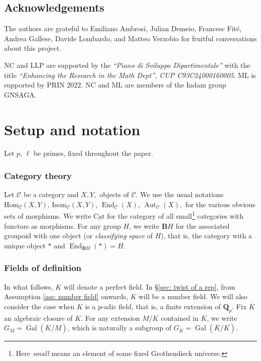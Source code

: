 \documentclass[a4paper,10pt]{amsart}
\theoremstyle{plain}
\theoremstyle{definition}
\theoremstyle{remark}
\def\Q{\mathbf Q}
\def\ul#1{\underline{#1}}
\def\mr#1{\mathrm{#1}}
\def\Ccal{\mathcal{C}}
\def\Bbf{\mathbf{B}}
\renewcommand{\hom}{\mr{Hom}}
\DeclareMathOperator{\Aut}{Aut}
\DeclareMathOperator{\Gal}{Gal}
\DeclareMathOperator{\End}{End}
\begin{document}
\subsection*{Acknowledgements}
The authors are grateful to Emiliano Ambrosi, Julian Demeio, Francesc Fit\'e, Andrea Gallese, Davide Lombardo, and Matteo Verzobio for fruitful conversations about this project.
\par NC and LLP are supported by the \emph{``Piano di Sviluppo Dipartimentale''} with the title \emph{``Enhancing the Research in the Math Dept'', CUP C93C24000160005}. ML is supported by PRIN 2022. NC and ML are members of the Indam group GNSAGA.

\section{Setup and notation}\label{sec: setup}

Let \(p,\, \ell\) be primes, fixed throughout the paper.

\subsubsection*{Category theory}
Let \(\Ccal\) be a category and \(X, Y,\) objects of \(\Ccal\). We use the usual notations \(\hom_{\Ccal}(X, Y)\), \(\mr{Isom}_{\Ccal}(X, Y)\), \(\End_{\Ccal}(X)\), \(\Aut_{\Ccal}(X),\) for the various obvious sets of morphisms. We write \(\ul{\mr{Cat}}\) for the category of all small\footnote{Here \emph{small} means an element of some fixed Grothendieck universe.} categories with functors as morphisms. For any group \(H\), we write \(\Bbf H\) for the associated groupoid  with one object (or \emph{classifying space} of \(H\)), that is, the category with a unique object \(\ast\) and \(\End_{\Bbf H}(\ast) = H\). 

\subsubsection*{Fields of definition}
In what follows, \(K\) will denote a perfect field. In \S\ref{sec: twist of a rep}, from Assumption \ref{ass: number field} onwards, \(K\) will be a number field. We will also consider the case when \(K\) is a \(p\)-adic field, that is, a finite extension of \(\Q_p\). Fix \(\overline{K}\) an algebraic closure of \(K\). 
For any extension \(M/K\) contained in \(\overline{K}\), we write \(G_M = \Gal(\overline{K}/M)\), which is naturally a subgroup of \(G_K = \Gal(\overline{K}/K)\).
\end{document}
